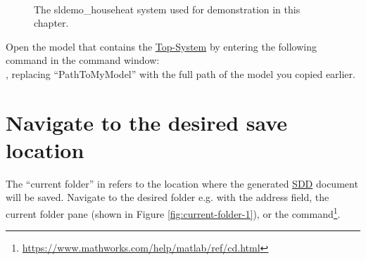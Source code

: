 \documentclass{mcscert}
\newcommand{\topsystemnolink}{Top-System} %
\newcommand{\topsystem}{\hyperref[def:topsystem]{\topsystemnolink{}}}
\begin{document}
\begin{figure}
  \caption{The sldemo\_househeat system used for demonstration in this chapter.}
  \centering
  \label{fig:ex-topsys}
  \\
\end{figure}

Open the model that contains the \topsystem{} by entering the following command in the \matlab{} command window:\\
, replacing ``PathToMyModel'' with the full path of the model you copied earlier. 

\section*{Navigate to the desired save location}
\label{sec:Nav2DesSaveLoc}
The ``current folder'' in \matlab{} refers to the location where the generated \hyperref[acr:sdd]{SDD} document will be saved.
Navigate to the desired folder e.g. with the address field, the current folder pane (shown in Figure \ref{fig:current-folder-1}), or the  command\footnote{\href{https://www.mathworks.com/help/matlab/ref/cd.html}{https://www.mathworks.com/help/matlab/ref/cd.html}}.
\end{document}
